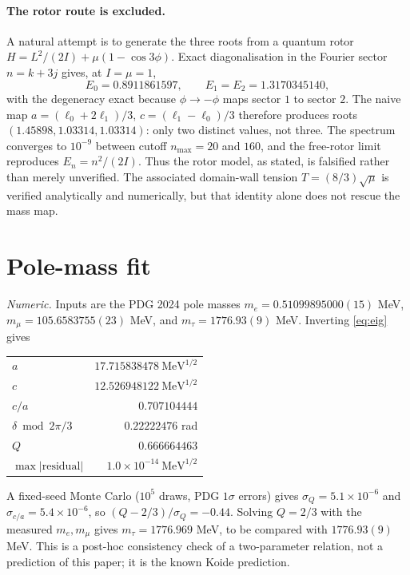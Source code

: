 \documentclass[11pt]{article}
\begin{document}
\paragraph{The rotor route is excluded.} A natural attempt is to generate the
three roots from a quantum rotor $H=L^2/(2I)+\mu(1-\cos3\phi)$. Exact
diagonalisation in the Fourier sector $n=k+3j$ gives, at $I=\mu=1$,
\begin{equation}
E_0=0.8911861597,\qquad E_1=E_2=1.3170345140,
\label{eq:rotor}
\end{equation}
with the degeneracy exact because $\phi\to-\phi$ maps sector $1$ to sector $2$.
The naive map $a=(\ell_0+2\ell_1)/3$, $c=(\ell_1-\ell_0)/3$ therefore produces
roots $(1.45898,1.03314,1.03314)$: only two distinct values, not three. The
spectrum converges to $10^{-9}$ between cutoff $n_{\max}=20$ and $160$, and the
free-rotor limit reproduces $E_n=n^2/(2I)$. Thus the rotor model, as stated, is
falsified rather than merely unverified. The associated domain-wall tension
$T=(8/3)\sqrt{\mu}$ is verified analytically and numerically, but that identity
alone does not rescue the mass map.

\section{Pole-mass fit}
\label{sec:fit}

\emph{Numeric.} Inputs are the PDG 2024 pole masses
$m_e=0.51099895000(15)$ MeV, $m_\mu=105.6583755(23)$ MeV, and
$m_\tau=1776.93(9)$ MeV. Inverting \eqref{eq:eig} gives
\begin{center}
\begin{tabular}{lr}
\toprule
$a$ & $17.715838478\ \mathrm{MeV}^{1/2}$\\
$c$ & $12.526948122\ \mathrm{MeV}^{1/2}$\\
$c/a$ & $0.707104444$\\
$\delta \bmod 2\pi/3$ & $0.22222476$ rad\\
$Q$ & $0.666664463$\\
$\max|\text{residual}|$ & $1.0\times10^{-14}\ \mathrm{MeV}^{1/2}$\\
\bottomrule
\end{tabular}
\end{center}
A fixed-seed Monte Carlo ($10^5$ draws, PDG $1\sigma$ errors) gives
$\sigma_Q=5.1\times10^{-6}$ and $\sigma_{c/a}=5.4\times10^{-6}$, so
$(Q-2/3)/\sigma_Q=-0.44$. Solving $Q=2/3$ with the measured $m_e,m_\mu$ gives
$m_\tau=1776.969$ MeV, to be compared with $1776.93(9)$ MeV. This is a
post-hoc consistency check of a two-parameter relation, not a prediction of
this paper; it is the known Koide prediction.
\end{document}
